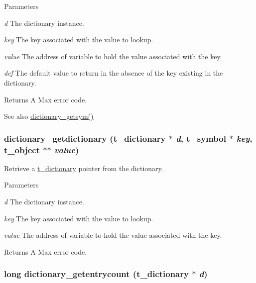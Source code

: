 \begin{DoxyParams}{Parameters}
\item[{\em d}]The dictionary instance. \item[{\em key}]The key associated with the value to lookup. \item[{\em value}]The address of variable to hold the value associated with the key. \item[{\em def}]The default value to return in the absence of the key existing in the dictionary. \end{DoxyParams}
\begin{DoxyReturn}{Returns}
A Max error code.
\end{DoxyReturn}
\begin{DoxySeeAlso}{See also}
\hyperlink{group__dictionary_ga0e5747682765d9a320bb9ccf37d9215d}{dictionary\_\-getsym()} 
\end{DoxySeeAlso}
\hypertarget{group__dictionary_ga1bcef0af352c4f9df233818028083ea7}{
\subsubsection[{dictionary\_\-getdictionary}]{ dictionary\_\-getdictionary ({\bf t\_\-dictionary} $\ast$ {\em d}, \/  {\bf t\_\-symbol} $\ast$ {\em key}, \/  {\bf t\_\-object} $\ast$$\ast$ {\em value})}}
\label{group__dictionary_ga1bcef0af352c4f9df233818028083ea7}


Retrieve a \hyperlink{structt__dictionary}{t\_\-dictionary} pointer from the dictionary. 
\begin{DoxyParams}{Parameters}
\item[{\em d}]The dictionary instance. \item[{\em key}]The key associated with the value to lookup. \item[{\em value}]The address of variable to hold the value associated with the key. \end{DoxyParams}
\begin{DoxyReturn}{Returns}
A Max error code. 
\end{DoxyReturn}
\hypertarget{group__dictionary_ga1a080d24b75cd6a8dc20a9143f662136}{
\subsubsection[{dictionary\_\-getentrycount}]{\setlength{\rightskip}{0pt plus 5cm}long dictionary\_\-getentrycount ({\bf t\_\-dictionary} $\ast$ {\em d})}}
\label{group__dictionary_ga1a080d24b75cd6a8dc20a9143f662136}


